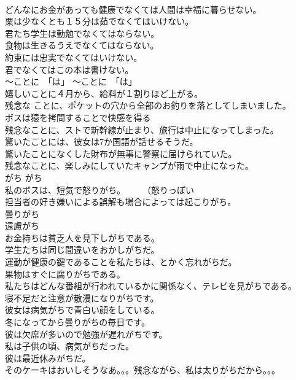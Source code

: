 \documentclass[8pt]{extreport}
\begin{document}
\begin{CJK}{UTF8}{min}
\\	どんなにお金があっても健康でなくては人間は幸福に暮らせない。   
\\	栗は少なくとも１５分は茹でなくてはいけない。   
\\	君たち学生は勤勉でなくてはならない。   
\\	食物は生きるうえでなくてはならない。   
\\	約束には忠実でなくてはいけない。   
\\	君でなくてはこの本は書けない。  
\\	〜ことに　「は」	〜ことに　「は」	
\\	嬉しいことに４月から、給料が１割りほど上がる。  
\\	残念な ことに、ポケットの穴から全部のお釣りを落としてしまいました。  
\\	ボスは猿を拷問することで快感を得る 
\\	残念なことに、ストで新幹線が止まり、旅行は中止になってしまった。  
\\	驚いたことには、彼女は7か国語が話せるそうだ。  
\\	驚いたことになくした財布が無事に警察に届けられていた。  
\\	残念なことに、楽しみにしていたキャンプが雨で中止になった。  
\\	がち	がち	
\\	私のボスは、短気で怒りがち。　　　（怒りっぽい 
\\	担当者の好き嫌いによる誤解も場合によっては起こりがち。  
\\	曇りがち   
\\	遠慮がち   
\\	お金持ちは貧乏人を見下しがちである。  
\\	学生たちは同じ間違いをおかしがちだ。  
\\	運動が健康の鍵であることを私たちは、とかく忘れがちだ。  
\\	果物はすぐに腐りがちである。  
\\	私たちはどんな番組が行われているかに関係なく、テレビを見がちである。  
\\	寝不足だと注意が散漫になりがちです。  
\\	彼女は病気がちで青白い顔をしている。   
\\	冬になってから曇りがちの毎日です。   
\\	彼は欠席が多いので勉強が遅れがちです。  
\\	私は子供の頃、病気がちだった。  
\\	彼は最近休みがちだ。   
\\	そのケーキはおいしそうなあ。。。残念ながら、私は太りがちだから。。。  

\end{CJK}
\end{document}
